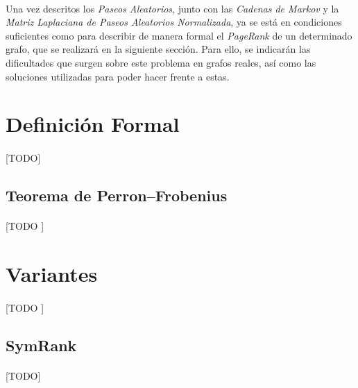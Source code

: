 \documentclass{subfiles}
\begin{document}
      \paragraph{}
      Una vez descritos los \emph{Paseos Aleatorios}, junto con las \emph{Cadenas de Markov} y la \emph{Matriz Laplaciana de Paseos Aleatorios Normalizada}, ya se está en condiciones suficientes como para describir de manera formal el \emph{PageRank} de un determinado grafo, que se realizará en la siguiente sección. Para ello, se indicarán las dificultades que surgen sobre este problema en grafos reales, así como las soluciones utilizadas para poder hacer frente a estas.

    \section{Definición Formal}
    \label{sec:pagerank_formal_definition}

      \paragraph{}
      [TODO]

      \subsection{Teorema de Perron–Frobenius}
      \label{sec:perron_frobenius_theorem}

        \paragraph{}
        [TODO ]

    \section{Variantes}
    \label{sec:pagerank_variants}

      \paragraph{}
      [TODO ]

      \subsection{SymRank}
      \label{sec:symrank}

        \paragraph{}
        [TODO]
\end{document}
